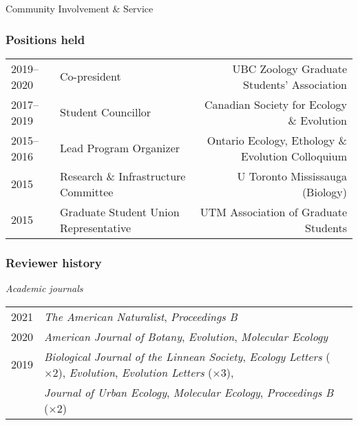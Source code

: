 \documentclass[11pt]{article}
\begin{document}
\noindent \begin{rSection}{Community Involvement \& Service}
\noindent

\subsubsection*{Positions held}
\begin{tabular}{llr}
2019--2020 & Co-president & UBC Zoology Graduate Students' Association\\ 
2017--2019 & Student Councillor & Canadian Society for Ecology \& Evolution\\
2015--2016 & Lead Program Organizer & Ontario Ecology, Ethology \& Evolution Colloquium\\
2015 & Research \& Infrastructure Committee & U Toronto Mississauga (Biology)\\
2015 & Graduate Student Union Representative &  UTM Association of Graduate Students\\
\end{tabular}
\vspace{1em}
\newpage
\subsubsection*{Reviewer history}

\noindent \textit{Academic journals}
\vspace{0.5em}

\begin{tabular}{llr}

2021 & \textit{The American Naturalist}, \textit{Proceedings B}\\

2020 & \textit{American Journal of Botany}, \textit{Evolution}, \textit{Molecular Ecology}\\

2019 & \textit{Biological Journal of the Linnean Society}, \textit{Ecology Letters} ($\times$2), \textit{Evolution}, \textit{Evolution Letters} ($\times$3), \\ 
& \textit{Journal of Urban Ecology}, \textit{Molecular Ecology}, \textit{Proceedings B} ($\times$2)\\


\end{tabular}
\end{rSection}
\end{document}
